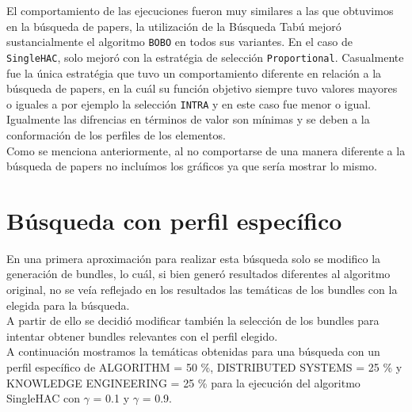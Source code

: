 El comportamiento de las ejecuciones fueron muy similares a las que obtuvimos en la búsqueda de papers, la utilización de la Búsqueda Tabú mejoró sustancialmente el algoritmo \texttt{BOBO} en todos sus variantes. En el caso de \texttt{SingleHAC}, solo mejoró con la estratégia de selección \texttt{Proportional}. Casualmente fue la única estratégia que tuvo un comportamiento diferente en relación a la búsqueda de papers, en la cuál su función objetivo siempre tuvo valores mayores o iguales a por ejemplo la selección \texttt{INTRA} y en este caso fue menor o igual. Igualmente las difrencias en términos de valor son mínimas y se deben a la conformación de los perfiles de los elementos.\\
Como se menciona anteriormente, al no comportarse de una manera diferente a la búsqueda de papers no incluímos los gráficos ya que sería mostrar lo mismo.
\newpage
\section{Búsqueda con perfil específico}
En una primera aproximación para realizar esta búsqueda solo se modifico la generación de bundles, 
lo cuál, si bien generó resultados diferentes al algoritmo original, no se veía reflejado en los 
resultados las temáticas de los bundles con la elegida para la búsqueda.\\
A partir de ello se decidió modificar también la selección de los bundles para intentar obtener 
bundles relevantes con el perfil elegido.\\
A continuación mostramos la temáticas obtenidas para una búsqueda con un perfil específico de 
ALGORITHM = 50 \%, DISTRIBUTED SYSTEMS = 25 \% y KNOWLEDGE ENGINEERING = 25 \% para la ejecución 
del algoritmo SingleHAC con $\gamma$ = 0.1 y $\gamma$ = 0.9.